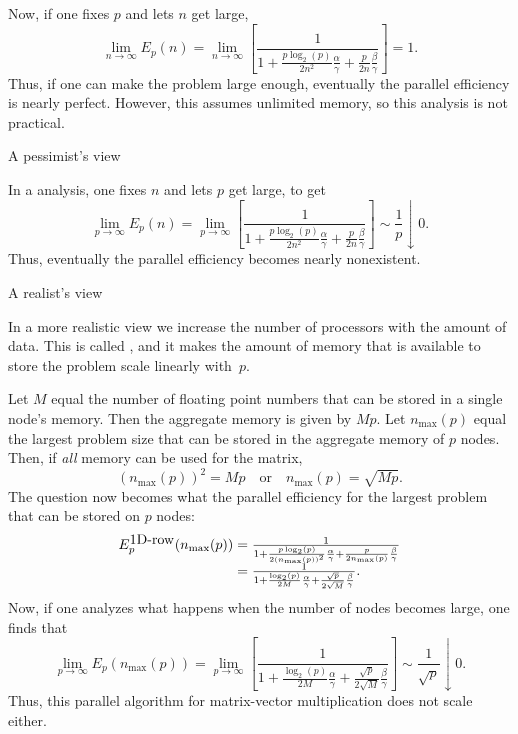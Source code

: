 Now, if one fixes $ p $ and lets $ n $ get large,
\[
\lim_{n \rightarrow \infty} E_p( n ) =
\lim_{n \rightarrow \infty}
\left[
\frac{1}
{ 1 + \frac{p \log_2(p)}{2 n^2} \frac{\alpha}{\gamma} 
+ \frac{p}{2 n} \frac{\beta}{\gamma} }
\right]
=
1.
\]
Thus, if one can make the problem large enough, eventually the parallel
efficiency is nearly perfect. However, this assumes unlimited memory,
so this analysis is not practical.

 {A pessimist's view}

In a  analysis,
one fixes $ n $ and lets $ p $ get large, to get
\[
\lim_{p \rightarrow \infty} E_p( n ) =
\lim_{p \rightarrow \infty}
\left[
\frac{1}
{1 + \frac{p \log_2(p)}{2 n^2} \frac{\alpha}{\gamma} 
+ \frac{p}{2 n} \frac{\beta}{\gamma} }
\right]
\sim \frac{1}{p}\downarrow
0.
\]
Thus, eventually the parallel efficiency becomes nearly nonexistent.

 {A realist's view}

In a more realistic view we increase the number of processors with the
amount of data. This is called , and 
it makes the amount of memory that is available to
store the problem scale linearly with~$ p $.  

Let $ M $ equal the
number of floating point numbers that can be stored in a single node's
memory.  Then the aggregate memory is given by $ M p $.  Let $
n_{\max}(p) $ equal the largest problem size that can be stored
in the aggregate memory of $ p $ nodes.  Then, if {\em all} memory can
be used for the matrix,
\[
(n_{\max}(p))^2 = M p
\quad
\mbox{or}
\quad
n_{\max}(p) = \sqrt{Mp}.
\]
The question now becomes what the parallel 
efficiency for the largest problem that can be stored on $ p $ nodes:
\[ 
\begin{array}{r@{{}={}}l}
E_p^{\mbox{1D-row}}(n_{\max}(p)) &
\frac{1}
{1 + \frac{p \log_2(p)}{2 (n_{\max}(p))^2} \frac{\alpha}{\gamma} 
+ \frac{p}{2 n_{\max}(p)} \frac{\beta}{\gamma} }
\\
&
\frac{1}
{ 1 + \frac{\log_2(p)}{2 M} \frac{\alpha}{\gamma} 
+ \frac{\sqrt{p}}{2 \sqrt{M}} \frac{\beta}{\gamma} }.
\end{array}
\]
Now, if one analyzes what happens when the number of nodes
becomes large, one finds that
\[
\lim_{p \rightarrow \infty} E_p( n_{\max}(p) ) 
=
\lim_{p \rightarrow \infty}
\left[
\frac{1}
{1 + \frac{\log_2(p)}{2 M} \frac{\alpha}{\gamma} 
+ \frac{\sqrt{p}}{2 \sqrt{M}} \frac{\beta}{\gamma} }
\right]
\sim \frac{1}{\sqrt p} \downarrow
0.
\]
Thus, this parallel algorithm for matrix-vector multiplication does
not scale either.

